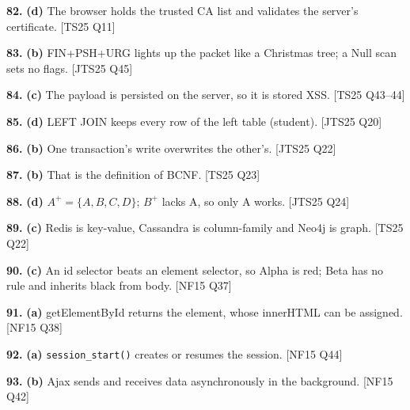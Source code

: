 \documentclass[11pt,a4paper]{article}
\begin{document}
\noindent\textbf{82.} \textbf{(d)} The browser holds the trusted CA list and validates the server's certificate. {\color{ember}\scriptsize[TS25 Q11]}\par\vspace{3pt}
\noindent\textbf{83.} \textbf{(b)} FIN+PSH+URG lights up the packet like a Christmas tree; a Null scan sets no flags. {\color{ember}\scriptsize[JTS25 Q45]}\par\vspace{3pt}
\noindent\textbf{84.} \textbf{(c)} The payload is persisted on the server, so it is stored XSS. {\color{ember}\scriptsize[TS25 Q43--44]}\par\vspace{3pt}
\noindent\textbf{85.} \textbf{(d)} LEFT JOIN keeps every row of the left table (student). {\color{ember}\scriptsize[JTS25 Q20]}\par\vspace{3pt}
\noindent\textbf{86.} \textbf{(b)} One transaction's write overwrites the other's. {\color{ember}\scriptsize[JTS25 Q22]}\par\vspace{3pt}
\noindent\textbf{87.} \textbf{(b)} That is the definition of BCNF. {\color{ember}\scriptsize[TS25 Q23]}\par\vspace{3pt}
\noindent\textbf{88.} \textbf{(d)} $A^+=\{A,B,C,D\}$; $B^+$ lacks A, so only A works. {\color{ember}\scriptsize[JTS25 Q24]}\par\vspace{3pt}
\noindent\textbf{89.} \textbf{(c)} Redis is key-value, Cassandra is column-family and Neo4j is graph. {\color{ember}\scriptsize[TS25 Q22]}\par\vspace{3pt}
\noindent\textbf{90.} \textbf{(c)} An id selector beats an element selector, so Alpha is red; Beta has no rule and inherits black from body. {\color{ember}\scriptsize[NF15 Q37]}\par\vspace{3pt}
\noindent\textbf{91.} \textbf{(a)} getElementById returns the element, whose innerHTML can be assigned. {\color{ember}\scriptsize[NF15 Q38]}\par\vspace{3pt}
\noindent\textbf{92.} \textbf{(a)} \texttt{session\_start()} creates or resumes the session. {\color{ember}\scriptsize[NF15 Q44]}\par\vspace{3pt}
\noindent\textbf{93.} \textbf{(b)} Ajax sends and receives data asynchronously in the background. {\color{ember}\scriptsize[NF15 Q42]}\par\vspace{3pt}
\end{document}
